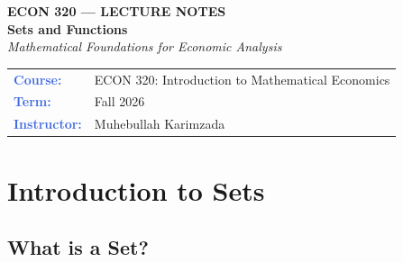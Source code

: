 \documentclass[12pt, a4paper]{article}
\theoremstyle{definition}
\begin{document}

\thispagestyle{empty}

\vspace*{-1.5cm}
\begin{center}
  {\color{white}\large\bfseries\sffamily ECON 320 --- LECTURE NOTES}\\[10pt]
  {\color{white}\Huge\bfseries Sets and Functions}\\[8pt]
  {\color{gold}\large\itshape Mathematical Foundations for Economic Analysis}
\end{center}

\vspace{3.4cm}

\begin{center}
\begin{tabular}{l l}
  \textbf{\textcolor{royalblue}{Course:}}        & ECON 320: Introduction to Mathematical Economics \\[3pt]


  \textbf{\textcolor{royalblue}{Term:}}          & Fall 2026 \\[3pt]
    \textbf{\textcolor{royalblue}{Instructor:}}          & Muhebullah Karimzada \\[3pt]
\end{tabular}
\end{center}



\newpage
\tableofcontents
\newpage

\section{Introduction to Sets}

\subsection{What is a Set?}
\end{document}
